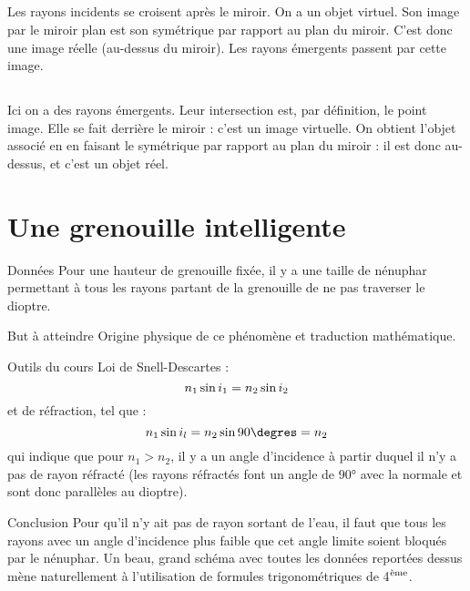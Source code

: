 \documentclass[10pt,a5paper,notitlepage]{book}
\begin{document}
\subsection{}
Les rayons incidents se croisent après le miroir. On a un objet virtuel. Son
image par le miroir plan est son symétrique par rapport au plan du miroir. C'est
donc une image réelle (au-dessus du miroir). Les rayons émergents passent par
cette image.

\subsection{}
Ici on a des rayons émergents. Leur intersection est, par définition, le point
image. Elle se fait derrière le miroir : c'est un image virtuelle. On obtient
l'objet associé en en faisant le symétrique par rapport au plan du miroir : il
est donc au-dessus, et c'est un objet réel.

\section{Une grenouille intelligente}
\begin{NCdefi}{Données}
    Pour une hauteur de grenouille fixée, il y a une taille de
    nénuphar permettant à tous les rayons partant de la grenouille de ne
    pas traverser le dioptre.
\end{NCdefi}

\begin{NCprop}{But à atteindre}
    Origine physique de ce phénomène et traduction mathématique.
\end{NCprop}

\begin{NCdemo}{Outils du cours}
    Loi de Snell-Descartes :
    \[ n_1\ss i_1 = n_2\ss i_2\]
    et  de réfraction, tel que :
    \[ n_1\ss i_l = n_2\ss 90\degres = n_2\]
    qui indique que pour $n_1 > n_2$, il y a un angle d'incidence à
    partir duquel il n'y a pas de rayon réfracté (les rayons réfractés font un
    angle de 90° avec la normale et sont donc parallèles au dioptre).
\end{NCdemo}

\begin{NCexem}{Conclusion}
     Pour qu'il n'y ait pas de rayon sortant de l'eau, il faut que tous les
     rayons avec un angle d'incidence plus faible que cet angle limite soient
     bloqués par le nénuphar. Un beau, grand schéma avec toutes les données
     reportées dessus mène naturellement à l'utilisation de formules
     trigonométriques de 4$\Ot{ème}$.
\end{NCexem}
\end{document}
